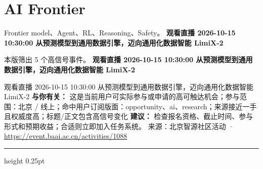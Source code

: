 \documentclass[10.5pt]{ctexart}
\begin{document}
\section*{AI Frontier}
{\color{ormuted} Frontier model、Agent、RL、Reasoning、Safety。}
\vspace{2mm}
{\LARGE\bfseries 观看直播 2026-10-15 10:30:00 从预测模型到通用数据引擎，迈向通用化数据智能 LimiX-2}\par
\vspace{1mm}
{\color{ormuted} 本版筛出 5 个高信号事件。}
\vspace{3mm}
{\Large\bfseries 观看直播 2026-10-15 10:30:00 从预测模型到通用数据引擎，迈向通用化数据智能 LimiX-2}\par
观看直播 2026-10-15 10:30:00 从预测模型到通用数据引擎，迈向通用化数据智能 LimiX-2
\textbf{与你有关：} 这是当前用户可实际参与或申请的高可触达机会；参与范围：北京 / 线上；命中用户订阅版面：opportunity、ai、research；来源接近一手且权威度高；标题/正文包含高信号变化
\textbf{建议：} 检查报名资格、截止时间、参与形式和预期收益；合适则立即加入任务系统。
{\footnotesize\color{ormuted} 来源：北京智源社区活动 · \url{https://event.baai.ac.cn/activities/1088}}
\vspace{4mm}
\hrule height 0.25pt
\vspace{3mm}
\end{document}
